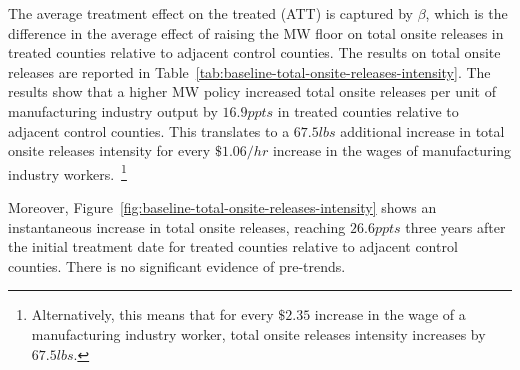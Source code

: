 \documentclass[12pt, english]{article}
\begin{document}
    The average treatment effect on the treated (ATT) is captured by $\beta$, which is the difference in the average effect of raising the MW floor on total onsite releases in treated counties relative to adjacent control counties. The results on total onsite releases are reported in Table~\ref{tab:baseline-total-onsite-releases-intensity}. The results show that a higher MW policy increased total onsite releases per unit of manufacturing industry output by $16.9ppts$ in treated counties relative to adjacent control counties. This translates to a $67.5lbs$ additional increase in total onsite releases intensity for every $\$1.06/hr$ increase in the wages of manufacturing industry workers.~\footnote{\tiny Alternatively, this means that for every $\$2.35$ increase in the wage of a manufacturing industry worker, total onsite releases intensity increases by $67.5lbs$.}
    

    Moreover, Figure~\ref{fig:baseline-total-onsite-releases-intensity} shows an instantaneous increase in total onsite releases, reaching $26.6ppts$ three years after the initial treatment date for treated counties relative to adjacent control counties. There is no significant evidence of pre-trends.
\end{document}
